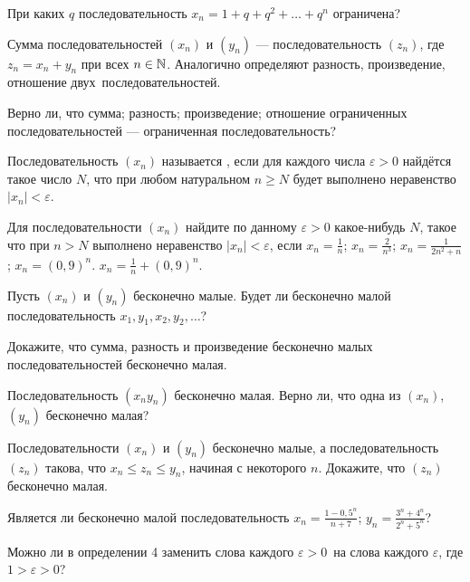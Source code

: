 \documentclass[a4paper, 11pt]{article}
\begin{document}
 При каких $q$ последовательность $x_n=1+q+q^2+\dots+q^n$
ограничена?

 Сумма последовательностей $(x_n)$ и $(y_n)$ ---
последовательность $(z_n)$, где $z_n=x_n+y_n$
при всех $n\in\mathbb{N}$. Аналогично определяют %
разность,
произведение, отношение двух~\hbox{последовательностей.}

 Верно ли, что
 сумма;
 разность;
 произведение;
 отношение ограниченных
последовательностей --- ограниченная последовательность?

 Последовательность $(x_n)$ называется , если
для каждого числа $\varepsilon>0$ найд\"ется такое число $N$,
что при любом натуральном $n\geq N$ будет выполнено неравенство $|x_n|<\varepsilon$.

Для %
последовательности $(x_n)$ найдите
по данному $\varepsilon>0$ какое-нибудь $N$,
такое что при $n>N$ выполнено  неравенство
$|x_n|<\varepsilon$, если
 $x_n = \frac1n$;
 $x_n = \frac2{n^3}$;
 $x_n = \frac1{2n^2+n}$;
 $x_n=(0,9)^n$.
 $x_n=\frac1n+(0,9)^n$.

Пусть $(x_n)$ и $(y_n)$
бесконечно малые. %
Будет ли бесконечно малой последовательность $x_1,y_1,x_2,y_2,\dots$?

Докажите, что сумма, разность и произведение бесконечно малых
последовательностей бесконечно малая.

Последовательность $(x_ny_n)$ бесконечно малая.
Верно ли, что одна из $(x_n)$, $(y_n)$
бесконечно малая?

 Последовательности $(x_n)$ и $(y_n)$
бесконечно малые, а последовательность
$(z_n)$ такова, что $x_n\leq z_n\leq y_n$, начиная с некоторого $n$. Докажите, что $(z_n)$ бесконечно малая.

 Является ли бесконечно малой последовательность
$x_n=\frac{1-0,5^n}{n+7}$;
$y_n=\frac{3^n+4^n}{2^n+5^n}$?

Можно ли в определении 4 заменить слова  каждого $\varepsilon>0$\
на слова  каждого $\varepsilon$, где $1>\varepsilon>0$?
\end{document}
